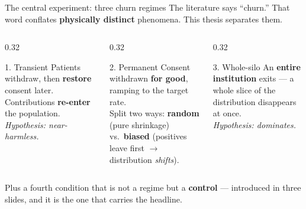 \documentclass[aspectratio=169, 11pt]{beamer}
\begin{document}
\begin{frame}{The central experiment: three churn regimes}
The literature says ``churn.'' That word conflates \textbf{physically
distinct} phenomena. This thesis separates them.
\vspace{0.5em}
\begin{columns}[T]
\begin{column}{0.32\textwidth}
\begin{block}{1. Transient}
Patients withdraw, then \textbf{restore} consent later. Contributions
\textbf{re-enter} the population.\\[0.3em]
{\footnotesize \emph{Hypothesis: near-harmless.}}
\end{block}
\end{column}
\begin{column}{0.32\textwidth}
\begin{block}{2. Permanent}
Consent withdrawn \textbf{for good}, ramping to the target rate.\\[0.3em]
Split two ways: \textbf{random} (pure shrinkage) vs.\ \textbf{biased}
(positives leave first $\rightarrow$ distribution \emph{shifts}).
\end{block}
\end{column}
\begin{column}{0.32\textwidth}
\begin{block}{3. Whole-silo}
An \textbf{entire institution} exits --- a whole slice of the distribution
disappears at once.\\[0.3em]
{\footnotesize \emph{Hypothesis: dominates.}}
\end{block}
\end{column}
\end{columns}
\vspace{0.6em}
{\footnotesize Plus a fourth condition that is not a regime but a
\textbf{control} --- introduced in three slides, and it is the one that
carries the headline.}
\end{frame}
\end{document}
